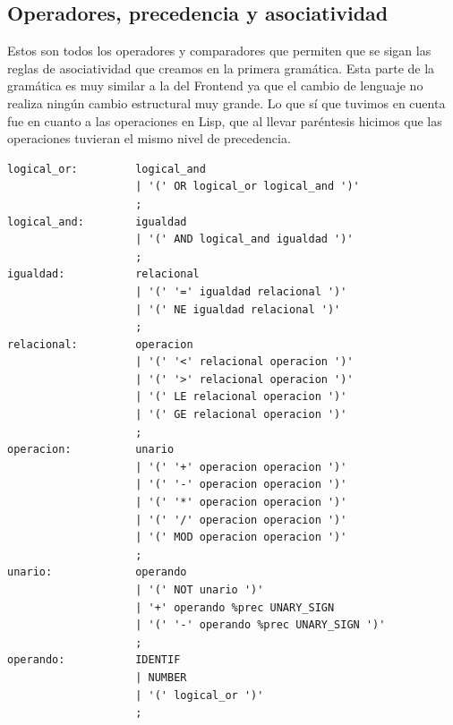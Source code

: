 \documentclass[12pt,a4paper]{article}
\begin{document}
\subsection{Operadores, precedencia y asociatividad}
\noindent Estos son todos los operadores y comparadores que permiten que se sigan las reglas de 
asociatividad que creamos en la primera gramática. Esta parte de la gramática es muy similar a la 
del Frontend ya que el cambio de lenguaje no realiza ningún cambio estructural muy grande. Lo que sí
que tuvimos en cuenta fue en cuanto a las operaciones en Lisp, que al llevar paréntesis hicimos que las
operaciones tuvieran el mismo nivel de precedencia.
\begin{lstlisting}
logical_or:         logical_and                                                         
                    | '(' OR logical_or logical_and ')'      
                    ;                               
logical_and:        igualdad                                                            
                    | '(' AND logical_and igualdad ')'       
                    ;                               
igualdad:           relacional                                                          
                    | '(' '=' igualdad relacional ')'        
                    | '(' NE igualdad relacional ')'        
                    ;                               
relacional:         operacion                                                          
                    | '(' '<' relacional operacion ')'     
                    | '(' '>' relacional operacion ')'   
                    | '(' LE relacional operacion ')'   
                    | '(' GE relacional operacion ')'    
                    ;                               
operacion:          unario                                                              
                    | '(' '+' operacion operacion ')'    
                    | '(' '-' operacion operacion ')'  
                    | '(' '*' operacion operacion ')'  
                    | '(' '/' operacion operacion ')'  
                    | '(' MOD operacion operacion ')'  
                    ;                                                   
unario:             operando                                                            
                    | '(' NOT unario ')'                           
                    | '+' operando %prec UNARY_SIGN                                    
                    | '(' '-' operando %prec UNARY_SIGN ')'   
                    ;
operando:           IDENTIF
                    | NUMBER                                                            
                    | '(' logical_or ')'                                                
                    ;
\end{lstlisting}
\end{document}
